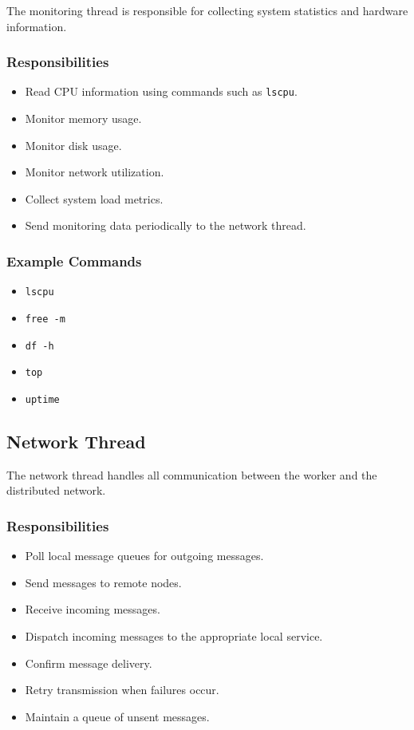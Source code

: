 \documentclass[12pt,a4paper]{article}
\begin{document}
The monitoring thread is responsible for collecting system statistics and hardware information.

\subsubsection{Responsibilities}

\begin{itemize}
    \item Read CPU information using commands such as \texttt{lscpu}.
    \item Monitor memory usage.
    \item Monitor disk usage.
    \item Monitor network utilization.
    \item Collect system load metrics.
    \item Send monitoring data periodically to the network thread.
\end{itemize}

\subsubsection{Example Commands}

\begin{itemize}
    \item \texttt{lscpu}
    \item \texttt{free -m}
    \item \texttt{df -h}
    \item \texttt{top}
    \item \texttt{uptime}
\end{itemize}

\subsection{Network Thread}

The network thread handles all communication between the worker and the distributed network.

\subsubsection{Responsibilities}

\begin{itemize}
    \item Poll local message queues for outgoing messages.
    \item Send messages to remote nodes.
    \item Receive incoming messages.
    \item Dispatch incoming messages to the appropriate local service.
    \item Confirm message delivery.
    \item Retry transmission when failures occur.
    \item Maintain a queue of unsent messages.
\end{itemize}
\end{document}
